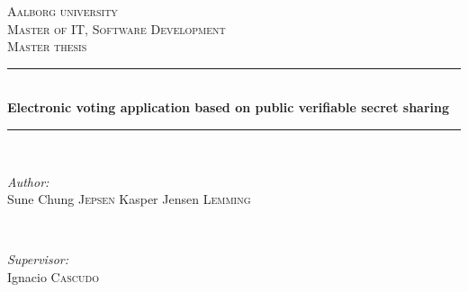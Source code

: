 \documentclass[a4paper]{report}
\theoremstyle{plain}
\begin{document}
\begin{titlepage}

\newcommand{\HRule}{\rule{\linewidth}{0.5mm}} %

\center %
 

\textsc{\LARGE Aalborg university}\\[1.5cm] %
\textsc{\Large Master of IT, Software Development}\\[0.5cm] %
\textsc{\large Master thesis}\\[0.5cm] %


\HRule \\[0.4cm]
{ \huge \bfseries Electronic voting application based on public verifiable secret sharing}\\[0.4cm] %
\HRule \\[1.5cm]
 

\begin{minipage}{0.4\textwidth}
\begin{flushleft} \large
\emph{Author:}\\
Sune Chung \textsc{Jepsen} %
Kasper Jensen \textsc{Lemming} %
\end{flushleft}
\end{minipage}
~
\begin{minipage}{0.4\textwidth}
\begin{flushright} \large
\emph{Supervisor:} \\
Ignacio \textsc{Cascudo} %
\end{flushright}
\end{minipage}\\[2cm]


\end{titlepage}
\end{document}
